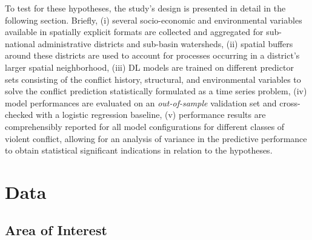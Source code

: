\documentclass[a4paper,11pt]{article}
\begin{document}
To test for these hypotheses, the study's design is presented in detail in the
following section. Briefly, (i) several socio-economic and environmental
variables available in spatially explicit formats are collected and aggregated for
sub-national administrative districts and sub-basin watersheds, (ii) spatial
buffers around these districts are used to account for processes occurring in a
district's larger spatial neighborhood, (iii) DL models are trained on different predictor
sets consisting of the conflict history, structural, and environmental variables
to solve the conflict prediction statistically formulated as a time series problem,
(iv) model performances are evaluated on an \emph{out-of-sample} validation set and
cross-checked with a logistic regression baseline, (v) performance results are comprehensibly
reported for all model configurations for different classes of violent conflict,
allowing for an analysis of variance in the predictive performance to obtain
statistical significant indications in relation to the hypotheses.

\newpage

\hypertarget{data}{%
\section{Data}\label{data}}

\hypertarget{area-of-interest}{%
\subsection{Area of Interest}\label{area-of-interest}}
\end{document}
